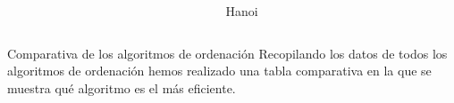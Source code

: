 \documentclass[spanish]{beamer}
\begin{document}
\begin{frame}
	\begin{columns}[c] %
		\begin{column}{.6\textwidth}
		\end{column}%
		
		\hfill%
		
		\begin{column}{.3\textwidth}
			Hanoi
		\end{column}%
		
	\end{columns}
\end{frame}

\begin{frame}{Comparativa de los algoritmos de ordenación}
	Recopilando los datos de todos los algoritmos de ordenación hemos realizado una tabla comparativa en la que se muestra qué algoritmo es el más eficiente.
\end{frame}

\begin{frame}
	\begin{center}
		
	\end{center}
\end{frame}

\begin{frame}
	\fontsize{8pt}{7.2}\selectfont
	\begin{center}
		
	\end{center}
\end{frame}

\begin{frame}
	\fontsize{8pt}{7.2}\selectfont
	\begin{center}
		
	\end{center}
\end{frame}

\begin{frame}
	\fontsize{8pt}{7.2}\selectfont
	\begin{center}
		
	\end{center}
\end{frame}

\begin{frame}
	\fontsize{8pt}{7.2}\selectfont
	\begin{center}
		
	\end{center}
\end{frame}
\end{document}
